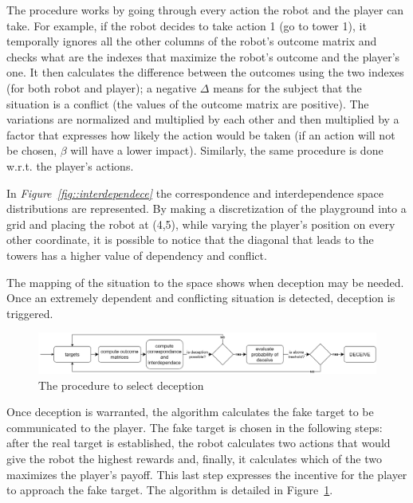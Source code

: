 The procedure works by going through every action the robot and the player can take. For example, if the robot decides to take action 1 (go to tower 1), it temporally ignores all the other columns of the robot's outcome matrix and checks what are the indexes that maximize the robot's outcome and the player's one. It then calculates the difference between the outcomes using the two indexes (for both robot and player); a negative $\Delta$ means for the subject that the situation is a conflict (the values of the outcome matrix are positive). The variations are normalized and multiplied by each other and then multiplied by a factor that expresses how likely the action would be taken (if an action will not be chosen, $\beta$ will have a lower impact). Similarly, the same procedure is done w.r.t. the player's actions.

In \textit{Figure~\ref{fig::interdependece}} the correspondence and interdependence space distributions are represented. By making a discretization of the playground into a grid and placing the robot at (4,5), while varying the  player's position on every other coordinate, it is possible to notice that the diagonal that leads to the towers has a higher value of dependency and conflict.

The mapping of the situation to the space shows when deception may be needed. Once an extremely dependent and conflicting situation is detected, deception is triggered.

\begin{figure}[t]
\centering
\includegraphics[width=\textwidth]{images/06-deception/flowchart}
\caption{The procedure to select deception}
\label{fig:flowchart}
\end{figure}

Once deception is warranted, the algorithm calculates the fake target to be communicated to the player. The fake target is chosen in the following steps: after the real target is established, the robot calculates two actions that would give the robot the highest rewards and, finally, it calculates which of the two maximizes the player's payoff. This last step expresses the incentive for the player to approach the fake target. The algorithm is detailed in Figure~\ref{fig:flowchart}.

